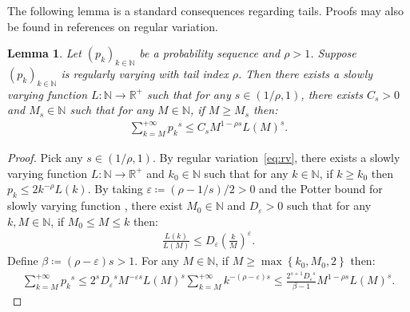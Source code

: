 \documentclass[12pt,reqno]{amsart}
\theoremstyle{definition}
\theoremstyle{plain}
\newtheorem{lemma}{Lemma}
\begin{document}
The following lemma is a standard consequences regarding tails. Proofs may also be found in references on regular variation.
\begin{lemma}\label{lem:tailpk}
Let $(p_k)_{k\in\mathbb{N}}$ be a probability sequence and $\rho>1$.
Suppose $(p_k)_{k\in\mathbb{N}}$ is regularly varying with tail index $\rho$.
Then there exists a slowly varying function $L:\mathbb{N}\to\mathbb{R}^+$ such that for any $s\in(1/\rho,1)$, there exists $C_s>0$ and $M_{s}\in\mathbb{N}$ such that for any $M\in\mathbb{N}$, if $M\geq M_s$ then:
\begin{align*}
    \sum_{k=M}^{+\infty} {p_k}^{s} \leq C_s M^{1-\rho s}L(M)^{s}.
\end{align*}
\end{lemma}
\begin{proof}
    Pick any $s\in(1/\rho,1)$. By regular variation~\eqref{eq:rv}, there exists a slowly varying function $L:\mathbb{N}\to\mathbb{R}^+$ and $k_0\in\mathbb{N}$ such that for any $k\in\mathbb{N}$, if $k\geq k_0$ then $p_k\leq 2k^{-\rho}L(k)$. By taking $\varepsilon\coloneqq(\rho-1/s)/2>0$ and the Potter bound for slowly varying function \cite[Theorem 1.5.6]{BinghamGoldieTeugels1987}, there exist $M_0\in\mathbb{N}$ and $D_\varepsilon>0$ such that for any $k,M\in\mathbb{N}$, if $M_0\leq M\leq k$ then:
    \begin{align*}
        \frac{L(k)}{L(M)}\leq D_{\varepsilon}\left(\frac{k}{M}\right)^{\varepsilon}.
    \end{align*}
    Define $\beta\coloneqq(\rho-\varepsilon)s>1$. For any $M\in\mathbb{N}$, if $M\geq\max{\left\{k_0,M_0,2\right\}}$ then:
    \begin{align*}
        \sum_{k=M}^{+\infty}{p_k}^s
        \leq 2^{s}{D_\varepsilon}^s M^{-\varepsilon s} L(M)^s\sum_{k=M}^{+\infty}{k}^{-(\rho-\varepsilon)s}
        \leq\frac{2^{s+1}{D_\varepsilon}^s}{\beta-1}M^{1-\rho s} L(M)^s.
    \end{align*}
\end{proof}
\end{document}
